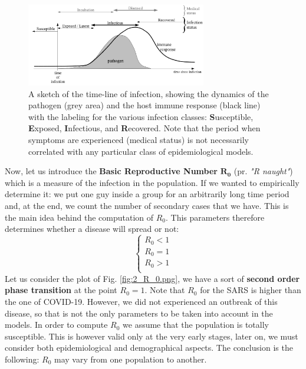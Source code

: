 \documentclass[../main/main.tex]{subfiles}
\begin{document}
\begin{figure}[h!]
\centering
\includegraphics[width=0.7\textwidth]{../lessons/image/02/5.png}
\caption{\label{fig:2_5} A sketch of the time-line of infection, showing the dynamics of the pathogen (grey area) and the host immune response (black line) with the labeling for the various infection classes: \textbf{S}usceptible, \textbf{E}xposed, \textbf{I}nfectious, and \textbf{R}ecovered. Note that the period when symptoms are experienced (medical status) is not necessarily correlated with any particular class of epidemiological models.}
\end{figure}

Now, let us introduce the \textbf{Basic Reproductive Number} $\mathbf{R_0}$ (pr. \textit{"R naught"}) which is a measure of the infection in the population. If we wanted to empirically determine it: we put one guy inside a group for an arbitrarily long time period and, at the end, we count the number of secondary cases that we have. This is the main idea behind the computation of \( R_0 \). This parameters therefore determines whether a disease will spread or not:
  \begin{equation}
    \begin{cases}
     R_0 < 1\\
     R_0 = 1\\
     R_0 > 1\\
    \end{cases}
  \end{equation}
Let us consider the plot of Fig. \ref{fig:2_R_0.png}, we have a sort of \textbf{second order phase transition} at the point $R_0=1$.
Note that $R_0$ for the SARS is higher than the one of COVID-19. However, we did not experienced an outbreak of this disease, so that is not the only parameters to be taken into account in the models. In order to compute $R_0$ we assume that the population is totally susceptible. This is however valid only at the very early stages, later on, we must consider both epidemiological and demographical aspects. The conclusion is the following: $R_0$ may vary from one population to another.
\end{document}
